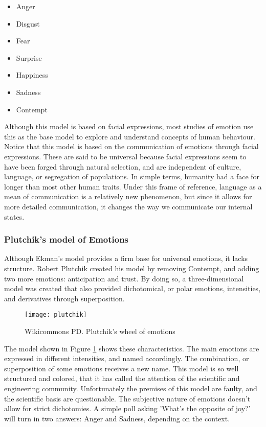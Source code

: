 \begin{itemize}
  \item Anger
  \item Disgust
  \item Fear
  \item Surprise
  \item Happiness
  \item Sadness
  \item Contempt
\end{itemize}

Although this model is based on facial expressions, most studies of emotion use this as the base model to explore and understand concepts of human behaviour. Notice that this model is based on the communication of emotions through facial expressions. These are said to be universal because facial expressions seem to have been forged through natural selection, and are independent of culture, language, or segregation of populations. In simple terms, humanity had a face for longer than most other human traits. Under this frame of reference, language as a mean of communication is a relatively new phenomenon, but since it allows for more detailed communication, it changes the way we communicate our internal states.

\subsubsection{Plutchik's model of Emotions}\label{subs:Plutchik's model of Emotions}
Although Ekman's model provides a firm base for universal emotions, it lacks structure. Robert Plutchik created his model by removing Contempt, and adding two more emotions: anticipation and trust. By doing so, a three-dimensional model was created that also provided dichotomical, or polar emotions, intensities, and derivatives through superposition.

\begin{figure}[H]
  \texttt{[image: plutchik]}
  \centering
  \caption{Wikicommons PD. Plutchik's wheel of emotions}\label{fig:plutchik}
\end{figure}

The model shown in Figure \ref{fig:plutchik} shows these characteristics. The main emotions are expressed in different intensities, and named accordingly. The combination, or superposition of some emotions receives a new name. This model is so well structured and colored, that it has called the attention of the scientific and engineering community. Unfortunately the premises of this model are faulty, and the scientific basis are questionable. The subjective nature of emotions doesn't allow for strict dichotomies. A simple poll asking 'What's the opposite of joy?' will turn in two answers: Anger and Sadness, depending on the context.

